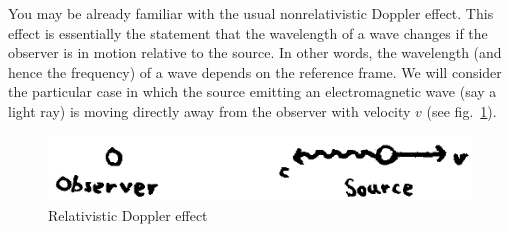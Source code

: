 You may be already familiar with the usual nonrelativistic Doppler effect. This effect is essentially the statement that the wavelength of a wave changes if the observer is in motion relative to the source. In other words, the wavelength (and hence the frequency) of a wave depends on the reference frame. We will consider the particular case in which the source emitting an electromagnetic wave (say a light ray) is moving directly away from the observer with velocity $v$ (see fig.\ \ref{fig:lec4_7}).
\begin{figure}[ht]
\begin{center}
\includegraphics[scale=0.6]{Draw/lec4_7.png}
\end{center}
\caption{Relativistic Doppler effect}
\label{fig:lec4_7}
\end{figure}

